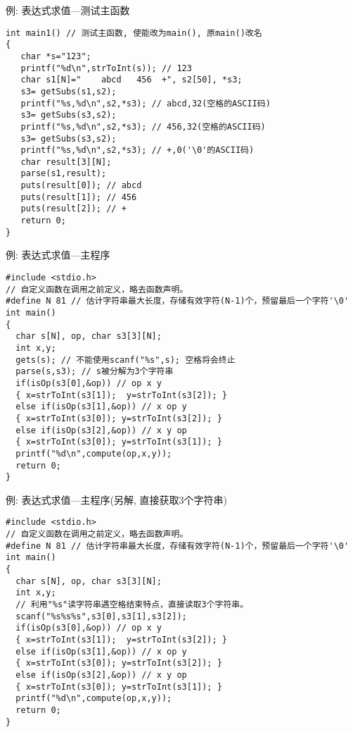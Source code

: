 \begin{frame}{例: 表达式求值---测试主函数}
\vspace{-0.3cm}
\begin{lstlisting}
int main1() // 测试主函数, 使能改为main(), 原main()改名
{
   char *s="123";
   printf("%d\n",strToInt(s)); // 123
   char s1[N]="    abcd   456  +", s2[50], *s3;
   s3= getSubs(s1,s2);
   printf("%s,%d\n",s2,*s3); // abcd,32(空格的ASCII码) 
   s3= getSubs(s3,s2);
   printf("%s,%d\n",s2,*s3); // 456,32(空格的ASCII码) 
   s3= getSubs(s3,s2);  
   printf("%s,%d\n",s2,*s3); // +,0('\0'的ASCII码)
   char result[3][N];
   parse(s1,result);
   puts(result[0]); // abcd
   puts(result[1]); // 456
   puts(result[2]); // +
   return 0;
}
\end{lstlisting}
\end{frame}

\begin{frame}{例: 表达式求值---主程序}
\vspace{-0.3cm}
\begin{lstlisting}
#include <stdio.h>
// 自定义函数在调用之前定义，略去函数声明。 
#define N 81 // 估计字符串最大长度，存储有效字符(N-1)个，预留最后一个字符'\0'
int main()
{
  char s[N], op, char s3[3][N];   
  int x,y;
  gets(s); // 不能使用scanf("%s",s); 空格将会终止
  parse(s,s3); // s被分解为3个字符串 
  if(isOp(s3[0],&op)) // op x y
  { x=strToInt(s3[1]);  y=strToInt(s3[2]); }
  else if(isOp(s3[1],&op)) // x op y
  { x=strToInt(s3[0]); y=strToInt(s3[2]); }
  else if(isOp(s3[2],&op)) // x y op
  { x=strToInt(s3[0]); y=strToInt(s3[1]); }
  printf("%d\n",compute(op,x,y)); 
  return 0;
}
\end{lstlisting}
\end{frame}

\begin{frame}{例: 表达式求值---主程序(另解, 直接获取3个字符串)}
\vspace{-0.3cm}
\begin{lstlisting}
#include <stdio.h>
// 自定义函数在调用之前定义，略去函数声明。
#define N 81 // 估计字符串最大长度，存储有效字符(N-1)个，预留最后一个字符'\0' 
int main()
{
  char s[N], op, char s3[3][N];   
  int x,y;
  // 利用"%s"读字符串遇空格结束特点，直接读取3个字符串。
  scanf("%s%s%s",s3[0],s3[1],s3[2]);
  if(isOp(s3[0],&op)) // op x y
  { x=strToInt(s3[1]);  y=strToInt(s3[2]); }
  else if(isOp(s3[1],&op)) // x op y
  { x=strToInt(s3[0]); y=strToInt(s3[2]); }
  else if(isOp(s3[2],&op)) // x y op
  { x=strToInt(s3[0]); y=strToInt(s3[1]); }
  printf("%d\n",compute(op,x,y)); 
  return 0;
}
\end{lstlisting}
\end{frame}

